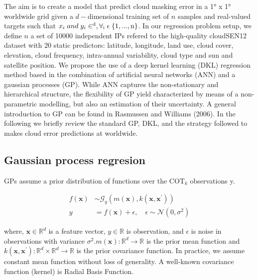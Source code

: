\documentclass[a4paper, nobind]{templates/cdethesis}
\begin{document}
The aim is to create a model that predict cloud masking error in a 1° x 1° worldwide grid given a \(d-\)dimensional training set of \(n\) samples and real-valued targets such that \(x_i\; and \; y_i \in \rm^{d}, \forall_i \; \epsilon \; \{1, ..., n\}\). In our regression problem setup, we define \(n\) a set of 10000 independent IPs refered to the high-quality cloudSEN12 dataset with 20 static predictors: latitude, longitude, land use, cloud cover, elevation, cloud frequency, intra-annual variability, cloud type and sun and satellite position. We propose the use of a deep kernel learning (DKL) regression method based in the combination of artificial neural networks (ANN) and a gaussian processes (GP). While ANN captures the non-stationary and hierarchical structure, the flexibility of GP yield characterized by means of a non-parametric modelling, but also an estimation of their uncertainty. A general introduction to GP can be found in Rasmussen and Williams (2006). In the following we briefly review the standard GP, DKL, and the strategy followed to makes cloud error predictions at worldwide.

\hypertarget{gaussian-process-regresion}{%
\subsection{Gaussian process regresion}\label{gaussian-process-regresion}}

GPs assume a prior distribution of functions over the \(\mathrm{COT}_{k}\) observations y.

\begin{equation}
    \begin{aligned}
        f(\mathbf{x}) & \sim 
            \mathcal{G}_{y}\left(
                m(\mathbf{x}), 
                k\left(\mathbf{x}, \mathbf{x}^{\prime}\right)\right
            ) \\
        y &=f(\mathbf{x})+\epsilon, \quad 
        \epsilon \sim \mathcal{N}\left(0, \sigma^{2}\right)
    \end{aligned} \label{eq:6}
\end{equation}

where, \(\mathbf{x} \in \mathbb{R}^{d}\) is a feature vector, \(y \in \mathbb{R}\) is observation, and \(\epsilon\) is noise in observations with variance \(\sigma^{2} . m(\mathbf{x}): \mathbb{R}^{d} \rightarrow \mathbb{R}\) is the prior mean function and \(k\left(\mathbf{x}, \mathbf{x}^{\prime}\right): \mathbb{R}^{d} \times \mathbb{R}^{d} \rightarrow \mathbb{R}\) is the prior covariance function. In practice, we assume constant mean function without loss of generality. A well-known covariance function (kernel) is Radial Basis Function.
\end{document}
